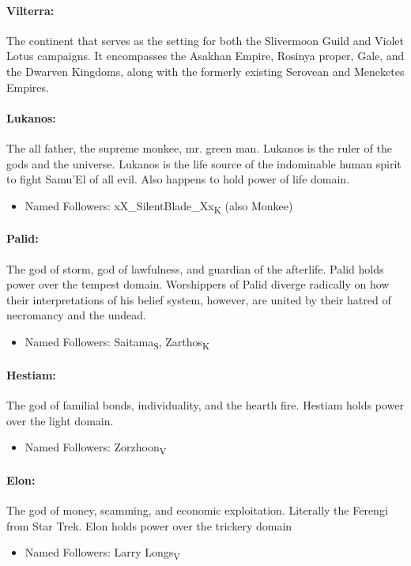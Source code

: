 \documentclass[../main.tex]{subfiles}
\begin{document}
\paragraph{Vilterra:}
The continent that serves as the setting for both the Slivermoon Guild and Violet Lotus campaigns. It encompasses the Asakhan Empire, Rosinya proper, Gale, and the Dwarven Kingdoms, along with the formerly existing Serovean and Meneketes Empires.
\paragraph{Lukanos:}
The all father, the supreme monkee, mr. green man. Lukanos is the ruler of the gods and the universe. Lukanos is the life source of the indominable human spirit to fight Samu’El of all evil. Also happens to hold power of life domain.
\begin{itemize}
    \item Named Followers: xX\_SilentBlade\_Xx\textsubscript{K} (also Monkee)
\end{itemize}
\paragraph{Palid:}
The god of storm, god of lawfulness, and guardian of the afterlife. Palid holds power over the tempest domain. Worshippers of Palid diverge radically on how their interpretations of his belief system, however, are united by their hatred of necromancy and the undead.
\begin{itemize}
    \item Named Followers: Saitama\textsubscript{S}, Zarthos\textsubscript{K}
\end{itemize}
\paragraph{Hestiam:}
The god of familial bonds, individuality, and the hearth fire. Hestiam holds power over the light domain.
\begin{itemize}
    \item Named Followers: Zorzhoon\textsubscript{V}
\end{itemize}
\paragraph{Elon: }
The god of money, scamming, and economic exploitation. Literally the Ferengi from Star Trek. Elon holds power over the trickery domain
\begin{itemize}
    \item Named Followers: Larry Longs\textsubscript{V}
\end{itemize}
\end{document}
